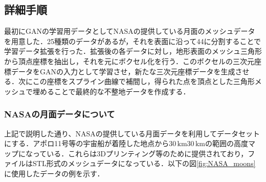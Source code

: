 \documentclass[twocolumn]{jarticle} %
\begin{document}
\subsection{詳細手順}
最初にGANの学習用データとしてNASAの提供している月面のメッシュデータを用意した．25種類のデータがあるが，それを表面に沿って4\times4に分割することで学習データ拡張を行った．拡張後の各データに対し，地形表面のメッシュ三角形から頂点座標を抽出し，それを元にボクセル化を行う．このボクセルの三次元座標データをGANの入力として学習させ，新たな三次元座標データを生成させる．次にこの座標をスプライン曲線で補間し，得られた点を頂点とした三角形メッシュで埋めることで最終的な不整地データを作成する．

\subsubsection{NASAの月面データについて}
上記で説明した通り、NASAの提供している月面データを利用してデータセットにする．アポロ11号等の宇宙船が着陸した地点から$30 \mathrm{\, km}$\times$30\mathrm{\, km}$の範囲の高度マップになっている．これらは3Dプリンティング等のために提供されており，ファイルはSTL形式のメッシュデータになっている．以下の図\ref{fig:NASA_moons}に使用したデータの例を示す．
\end{document}
